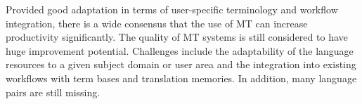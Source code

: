 \begin{multicols}{2}
Provided good adaptation in terms of user-specific terminology and workflow integration, there is a wide consensus that the use of MT can increase productivity significantly. The quality of MT systems is still considered to have huge improvement potential. Challenges include the adaptability of the language resources to a given subject domain or user area and the integration into existing workflows with term bases and translation memories. In addition, many language pairs are still missing. 
%

\end{multicols}
